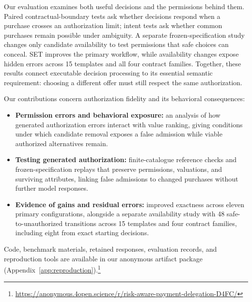 Our evaluation examines both useful decisions and the permissions behind them. Paired contractual-boundary tests ask whether decisions respond when a purchase crosses an authorization limit; intent tests ask whether common purchases remain possible under ambiguity. A separate frozen-specification study changes only candidate availability to test permissions that safe choices can conceal. SET improves the primary workflow, while availability changes expose hidden errors across 15 templates and all four contract families. Together, these results connect executable decision processing to its essential semantic requirement: choosing a different offer must still respect the same authorization.

Our contributions concern authorization fidelity and its behavioral consequences:
\begin{itemize}
\item \textbf{Permission errors and behavioral exposure:} an analysis of how generated authorization errors interact with value ranking, giving conditions under which candidate removal exposes a false admission while viable authorized alternatives remain.
\item \textbf{Testing generated authorization:} finite-catalogue reference checks and frozen-specification replays that preserve permissions, valuations, and surviving attributes, linking false admissions to changed purchases without further model responses.
\item \textbf{Evidence of gains and residual errors:} improved exactness across eleven primary configurations, alongside a separate availability study with 48 safe-to-unauthorized transitions across 15 templates and four contract families, including eight from exact starting decisions.
\end{itemize}

Code, benchmark materials, retained responses, evaluation records, and reproduction tools are available in our anonymous artifact package (Appendix~\ref{app:reproduction}).\footnote{\url{https://anonymous.4open.science/r/risk-aware-payment-delegation-D4FC/}}
